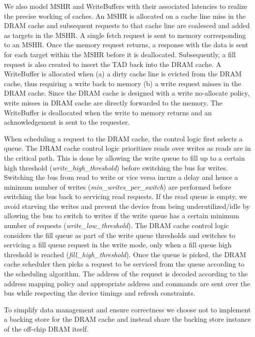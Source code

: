 \par We also model MSHR and WriteBuffers with their associated latencies to realize the precise working of caches. An MSHR is allocated on a cache line miss in the DRAM cache and subsequent requests to that cache line are coalesced and added as targets in the MSHR. A single fetch request is sent to memory corresponding to an MSHR. Once the memory request returns, a response with the data is sent for each target within the MSHR before it is deallocated. Subsequently, a fill request is also created to insert the TAD back into the DRAM cache. 
A WriteBuffer is allocated when (a) a dirty cache line is evicted from the DRAM cache, thus requiring a write back to memory (b) a write request misses in the DRAM cache. Since the DRAM cache is designed with a write no-allocate policy, write misses in DRAM cache are directly forwarded to the memory. The WriteBuffer is deallocated when the write to memory returns and an acknowledgement is sent to the requester. 
\par When scheduling a request to the DRAM cache, the control logic first selects a queue. The DRAM cache control logic prioritizes reads over writes as reads are in the critical path. This is done by allowing the write queue to fill up to a certain high threshold (\textit{write\_high\_threshold}) before switching the bus for writes. Switching the bus from read to write or vice versa incurs a delay and hence a minimum number of writes (\textit{min\_writes\_per\_switch}) are performed before switching the bus back to servicing read requests. If the read queue is empty, we avoid starving the writes and prevent the device from being underutilized/idle by allowing the bus to switch to writes if the write queue has a certain minimum number of requests (\textit{write\_low\_threshold}). The DRAM cache control logic considers the fill queue as part of the write queue thresholds and switches to servicing a fill queue request in the write mode, only when a fill queue high threshold is reached (\textit{fill\_high\_threshold}). Once the queue is picked, the DRAM cache scheduler then picks a request to be serviced from the queue according to the scheduling algorithm. The address of the request is decoded according to the  address mapping policy and appropriate address and commands are sent over the bus while respecting the device timings and refresh constraints.
\par To simplify data management and ensure correctness we choose not to implement a backing store for the DRAM cache and instead share the backing store instance of the off-chip DRAM itself.

